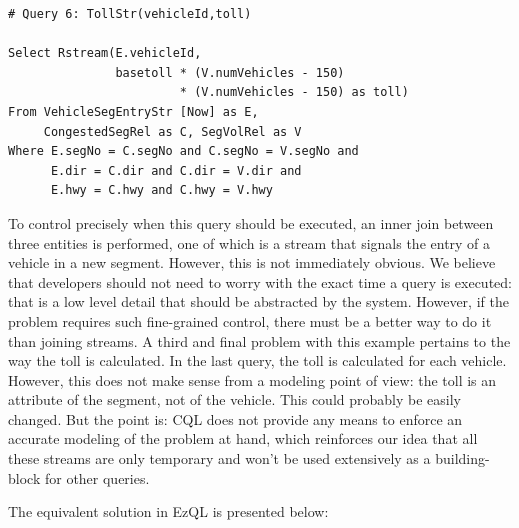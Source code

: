 \lstset{
  language=CCL,
  columns=fullflexible,
  basicstyle=\tt,
  keywordstyle=[1]\bf,
  keywordstyle=[2]\it,
}

\begin{lstlisting}
# Query 6: TollStr(vehicleId,toll)

Select Rstream(E.vehicleId,
               basetoll * (V.numVehicles - 150)
                        * (V.numVehicles - 150) as toll)
From VehicleSegEntryStr [Now] as E,
     CongestedSegRel as C, SegVolRel as V
Where E.segNo = C.segNo and C.segNo = V.segNo and
      E.dir = C.dir and C.dir = V.dir and
      E.hwy = C.hwy and C.hwy = V.hwy
\end{lstlisting}

\lstset{
  language=EzQL,
  columns=fullflexible,
  basicstyle=\tt,
  keywordstyle=[1]\bf,
  keywordstyle=[2]\it,
}

To control precisely when this query should be executed, an inner join
between three entities is performed, one of which is a stream that
signals the entry of a vehicle in a new segment. However, this is not
immediately obvious. We believe that developers should not need to
worry with the exact time a query is executed: that is a low level
detail that should be abstracted by the system. However, if the
problem requires such fine-grained control, there must be a better way
to do it than joining streams. A third and final problem with this
example pertains to the way the toll is calculated. In the last query,
the toll is calculated for each vehicle. However, this does not make
sense from a modeling point of view: the toll is an attribute of the
segment, not of the vehicle. This could probably be easily changed.
But the point is: CQL does not provide any means to enforce an
accurate modeling of the problem at hand, which reinforces our idea
that all these streams are only temporary and won't be used
extensively as a building-block for other queries.

The equivalent solution in EzQL is presented below:

